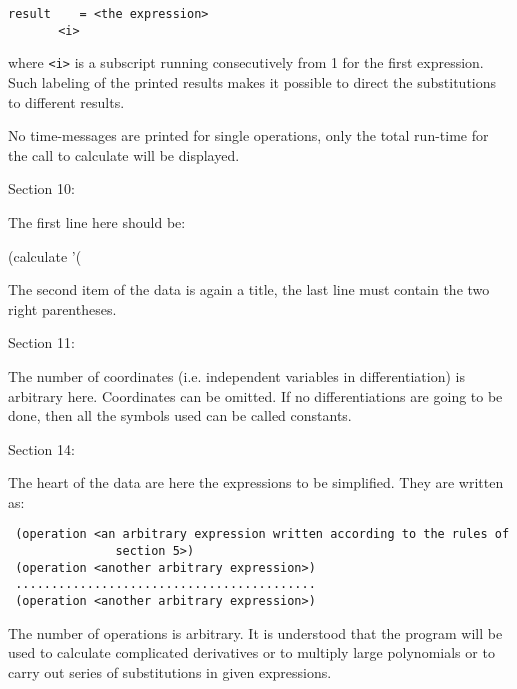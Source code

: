\bigskip

\begin{verbatim}
result    = <the expression>
       <i>
\end{verbatim}

\bigskip

\noindent where \verb+<i>+ is a subscript running consecutively  from  1  for
     the  first expression. Such labeling of the printed results
     makes it possible to direct the substitutions  to  different
     results.

No time-messages are  printed  for  single  operations,
     only  the  total  run-time for the call to calculate will be
     displayed.

\medskip

Section 10:

The first line here should be:

\medskip

(calculate '(

\medskip

The second item of the data is again a title, the last  line
     must contain the two right parentheses.

\medskip

Section 11:

The number of coordinates (i.e.  independent  variables
     in  differentiation)  is  arbitrary here. Coordinates can be
     omitted. If no differentiations are going to be  done,  then
     all the symbols used can be called constants.

\medskip

Section 14:

The heart of the data are here the  expressions  to  be
     simplified. They are written as:

\bigskip

\begin{verbatim}
 (operation <an arbitrary expression written according to the rules of
               section 5>)
 (operation <another arbitrary expression>)
 ..........................................
 (operation <another arbitrary expression>)
\end{verbatim}

\bigskip

The number of operations is arbitrary. It is understood that the program will
be used to calculate complicated derivatives or to multiply large polynomials
or to carry out series of substitutions in given expressions.

\medskip


